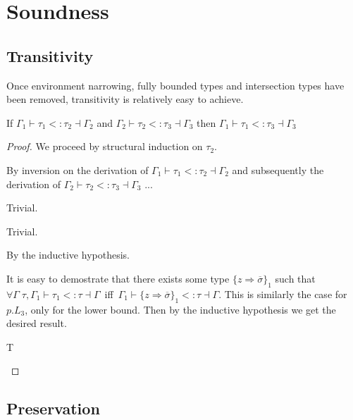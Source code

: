 \section{Soundness}

\subsection{Transitivity}

Once environment narrowing, fully bounded types and intersection types have been removed, transitivity is relatively easy to achieve.

\begin{theorem}[Transitivity]
If $\Gamma_1 \vdash \tau_1 <: \tau_2 \dashv \Gamma_2$ and $\Gamma_2 \vdash \tau_2 <: \tau_3 \dashv \Gamma_3$ then $\Gamma_1 \vdash \tau_1 <: \tau_3 \dashv \Gamma_3$
\end{theorem}
\begin{proof}
We proceed by structural induction on $\tau_2$.
\begin{case}[$\tau_2 = \{z \Rightarrow \overline{\sigma}\}$]
By inversion on the derivation of $\Gamma_1 \vdash \tau_1 <: \tau_2 \dashv \Gamma_2$  and subsequently the derivation of $\Gamma_2 \vdash \tau_2 <: \tau_3 \dashv \Gamma_3$ ...
\begin{subcase}[\textsc{S-Bottom}: $\tau_1 = \bot$]
Trivial.
\end{subcase}
\begin{subcase}[\textsc{S-Top}: $\tau_3 = \top$]
Trivial.
\end{subcase}
\begin{subcase}[$\tau_1 = \{z \Rightarrow \overline{\sigma}\}_1$, $\tau_3 = \{z \Rightarrow \overline{\sigma}\}_3$]
By the inductive hypothesis.
\end{subcase}
\begin{subcase}[$\tau_1 = p.L_1$, $\tau_2 = p.L_3$]
It is easy to demostrate that there exists some type $\{z \Rightarrow \overline{\sigma}\}_1$ such that 
$\forall \Gamma \; \tau, \Gamma_1 \vdash \tau_1 <: \tau \dashv \Gamma$\ iff\ $\Gamma_1 \vdash \{z \Rightarrow \overline{\sigma}\}_1 <: \tau \dashv \Gamma$. This is similarly the case for $p.L_3$, only for the lower bound. Then by the inductive hypothesis we get the desired result.
\end{subcase}
\end{case}
\begin{case}[$\tau_2 = p.L$]
T
\end{case}
\end{proof}


\subsection{Preservation}


